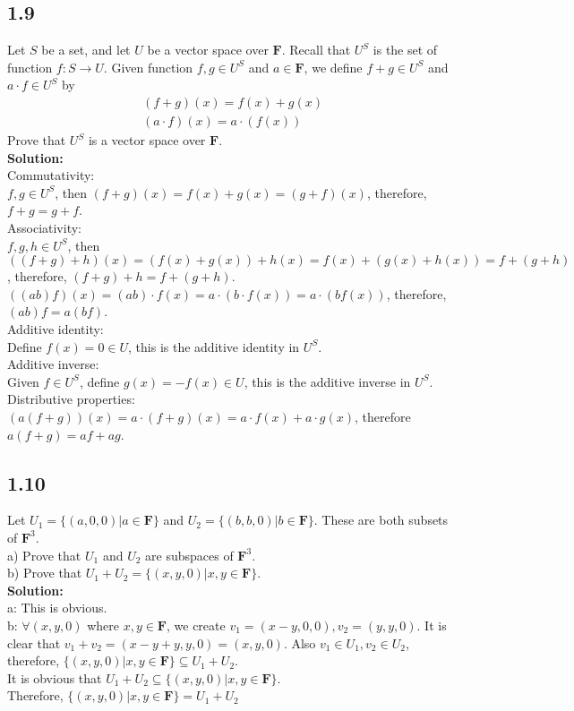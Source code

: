 \documentclass{article}
\begin{document}
\subsection{1.9}
Let $S$ be a set, and let $U$ be a vector space over $\textbf{F}$. Recall that $U^S$ is the set of function $f:S \rightarrow U$. Given function $f,g \in U^S$ and $a \in \textbf{F}$, we define $f + g \in U^S$ and $a \cdot f \in U^S$ by
\begin{align*}
(f+g)(x) = f(x) + g(x) \\
(a \cdot f)(x) = a \cdot (f(x))
\end{align*}
Prove that $U^S$ is a vector space over $\textbf{F}$.\\
\textbf{Solution:}\\
Commutativity:\\
$f,g \in U^S$, then $(f+g)(x) = f(x) + g(x) = (g+f)(x)$, therefore, $f+g = g+f$.\\
Associativity:\\
$f,g,h \in U^S$, then $((f+g)+h)(x) = (f(x) + g(x)) + h(x) = f(x) + (g(x) + h(x)) = f+(g+h)$, therefore, $(f+g)+h=f+(g+h)$.\\
$((ab)f)(x) = (ab)\cdot f(x) = a \cdot (b\cdot f(x)) = a \cdot (bf(x))$, therefore, $(ab)f = a(bf)$.\\
Additive identity:\\
Define $f(x) = 0 \in U$, this is the additive identity in $U^S$.\\
Additive inverse:\\
Given $f \in U^S$, define $g(x) = -f(x) \in U$, this is the additive inverse in $U^S$.\\
Distributive properties:\\
$(a(f+g))(x) = a \cdot (f+g)(x) = a\cdot f(x) + a\cdot g(x)$, therefore $a(f+g) = af + ag$.\\

\subsection{1.10}
Let $U_1 = \{(a,0,0)|a \in \textbf{F}\}$ and $U_2 = \{(b,b,0)|b \in \textbf{F}\}$. These are both subsets of $\textbf{F}^3$. \\
\indent a) Prove that $U_1$ and $U_2$ are subspaces of $\textbf{F}^3$. \\
\indent b) Prove that $U_1 + U_2 = \{(x,y,0)|x,y \in \textbf{F}\}$.\\
\textbf{Solution:}\\
a: This is obvious.\\
b: $\forall (x,y,0)$ where $x,y \in \textbf{F}$, we create $v_1 = (x-y,0,0), v_2 = (y,y,0)$. It is clear that $v_1 + v_2 = (x-y+y, y, 0) = (x, y, 0)$. Also $v_1 \in U_1, v_2 \in U_2$, therefore, $\{(x,y,0)|x,y \in \textbf{F}\} \subseteq U_1 + U_2$.\\
It is obvious that $U_1 + U_2 \subseteq \{(x,y,0)|x,y \in \textbf{F}\}$.\\
Therefore, $\{(x,y,0)|x,y \in \textbf{F}\} = U_1 + U_2$
\end{document}
